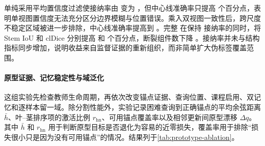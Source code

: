 \begin{table}[!htbp]
\centering
\caption{伪标签可靠性建模的消融结果。接纳率衡量进入无监督损失的像素比例，中心线准确率在隐藏的验证标注上离线计算。}
\label{tab:trpl-ablation}
\end{table}

单纯采用平均置信度过滤使接纳率由  变为 ，但中心线准确率只提高  个百分点，表明单视图置信度无法充分区分边界模糊与位置错误。乘入双视图一致性后，跨尺度不稳定区域被进一步排除，中心线准确率提高到 。完整 \TRPL 在保持  接纳率的同时，将 Stem IoU 和 clDice 分别提高  和  个百分点，断裂组件数下降 。接纳率并未与结构指标同步增加，说明收益来自监督证据的重新组织，而非简单扩大伪标签覆盖范围。

\paragraph{原型证据、记忆稳定性与域泛化}
这组实验先检查教师生命周期，再依次改变锚点证据、查询位置、课程启用、双记忆和逐样本留一域。除分割性能外，实验记录困难查询到正确锚点的平均余弦距离 $\bar h$、叶--茎排序项的激活比例 $r_{\mathrm{hn}}$、可用锚点覆盖率以及相邻更新间原型漂移 $\Delta q$。其中 $\bar h$ 和 $r_{\mathrm{hn}}$ 用于判断原型目标是否退化为容易的近零损失，覆盖率用于排除“损失很小只是因为没有可用锚点”的情况。结果列于\cref{tab:prototype-ablation}。

